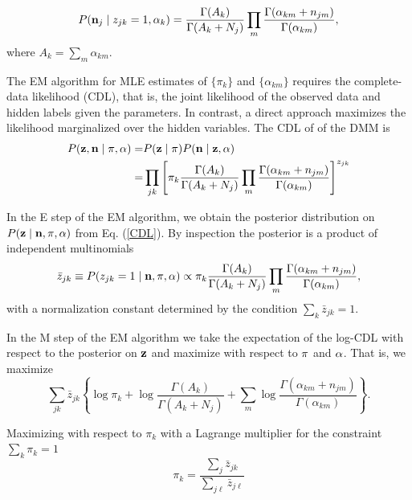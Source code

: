 \documentclass[nofootinbib,amssymb,amsmath]{revtex4}
\begin{document}
\begin{equation}
P({\bf n}_j \mid z_{jk} = 1, {\bf \alpha}_k ) = \frac{ \Gamma (A_k) }{ \Gamma (A_k + N_j) } \prod_m \frac{ \Gamma (\alpha_{km} + n_{jm}) }{ \Gamma (\alpha_{km}) },
\end{equation}
where $A_k = \sum_m \alpha_{km}$.

The EM algorithm for MLE estimates of $\{ \pi_k \}$ and $\{ \alpha_{km} \}$ requires the complete-data likelihood (CDL), that is, the joint likelihood of the observed data and hidden labels given the parameters.  In contrast, a direct approach maximizes the likelihood marginalized over the hidden variables.  The CDL of of the DMM is
\begin{align}
P({\bf z}, {\bf n} \mid {\bf \pi}, {\bf \alpha}) = & P({\bf z} \mid {\bf \pi}) P({\bf n} \mid {\bf z}, {\bf \alpha}) \\
= & \prod_{jk}  \left[ \pi_k \frac{ \Gamma (A_k) }{ \Gamma (A_k + N_j) } \prod_m \frac{ \Gamma (\alpha_{km} + n_{jm}) }{ \Gamma (\alpha_{km}) } \right]^{z_{jk}} \label{CDL}
\end{align}

In the E step of the EM algorithm, we obtain the posterior distribution on $P({\bf z} \mid {\bf n}, {\bf \pi}, {\bf \alpha})$ from Eq. (\ref{CDL}).  By inspection the posterior is a product of independent multinomials
\begin{equation}
\label{DMM_E_step}
\bar{z}_{jk} \equiv P(z_{jk} = 1 \mid {\bf n}, {\bf \pi}, {\bf \alpha})  \propto \pi_k \frac{ \Gamma (A_k) }{ \Gamma (A_k + N_j) } \prod_m \frac{ \Gamma (\alpha_{km} + n_{jm}) }{ \Gamma (\alpha_{km}) },
\end{equation}
with a normalization constant determined by the condition $\sum_k \bar{z}_{jk} = 1$.

In the M step of the EM algorithm we take the expectation of the log-CDL with respect to the posterior on ${\bf z}$ and maximize with respect to ${\bf \pi}$ and ${\bf \alpha}$.  That is, we maximize
\begin{equation}
\sum_{jk}  \bar{z}_{jk} \left\{ \log \pi_k + \log \frac{\Gamma (A_k)}{ \Gamma (A_k + N_j)}  + \sum_m \log \frac{ \Gamma (\alpha_{km} + n_{jm})}{\Gamma (\alpha_{km})}  \right\}.
\end{equation}

Maximizing with respect to $\pi_k$ with a Lagrange multiplier for the constraint $\sum_k \pi_k = 1$
\begin{equation}
\label{DMM_M_step_pi}
\pi_k = \frac{ \sum_j \bar{z}_{jk} }{\sum_{j \ell} \bar{z}_{j \ell}}
\end{equation}
\end{document}
